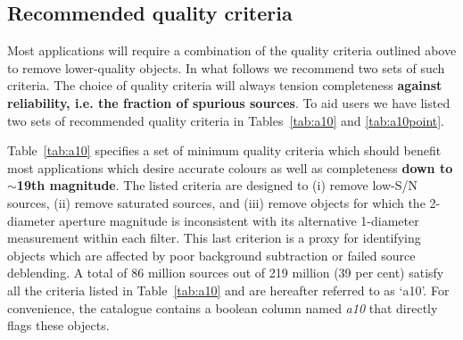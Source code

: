 \documentclass[a4paper,useAMS,usenatbib]{mn2e}
\begin{document}
{\subsection{Recommended quality criteria}
\label{sec:qualitycriteria}

Most applications will require
a combination of the quality criteria outlined above
to remove lower-quality objects.
In what follows we recommend two sets of such criteria.
The choice of quality criteria will always tension 
completeness {\bf against reliability,
i.e. the fraction of spurious sources}.
To aid users we have listed two sets of
recommended quality criteria 
in Tables~\ref{tab:a10} and \ref{tab:a10point}.

Table~\ref{tab:a10} specifies
a set of minimum quality criteria
which should benefit most applications
which desire accurate colours
as well as completeness {\bf down to $\sim$19th magnitude}.
The listed criteria are designed to 
(i) remove low-S/N sources, 
(ii) remove saturated sources,
and (iii) remove objects for which the 2-diameter
aperture magnitude is inconsistent 
with its alternative 1-diameter measurement
within each filter.
This last criterion is a proxy
for identifying objects which are affected
by poor background subtraction
or failed source deblending.
A total of 86 million sources out of 219 million 
(39 per cent) satisfy all the criteria listed in Table~\ref{tab:a10}
and are hereafter referred to as `a10'.
For convenience, the catalogue contains a boolean column
named \emph{a10} that directly flags these objects.

}
\end{document}
